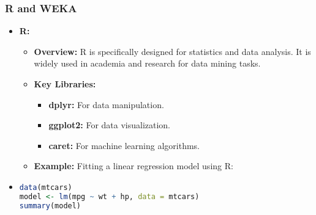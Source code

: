 \documentclass[aspectratio=169]{beamer}
\begin{document}
\begin{frame}[fragile]
    \frametitle{R and WEKA}
    \begin{itemize}
        \item \textbf{R:}
            \begin{itemize}
                \item \textbf{Overview:} R is specifically designed for statistics and data analysis. It is widely used in academia and research for data mining tasks.
                \item \textbf{Key Libraries:}
                    \begin{itemize}
                        \item \textbf{dplyr:} For data manipulation.
                        \item \textbf{ggplot2:} For data visualization.
                        \item \textbf{caret:} For machine learning algorithms.
                    \end{itemize}
                \item \textbf{Example:} Fitting a linear regression model using R:
            \end{itemize}
        \item \begin{lstlisting}[language=R]
data(mtcars)
model <- lm(mpg ~ wt + hp, data = mtcars)
summary(model)
        \end{lstlisting}
    \end{itemize}
    

\end{frame}
\end{document}

